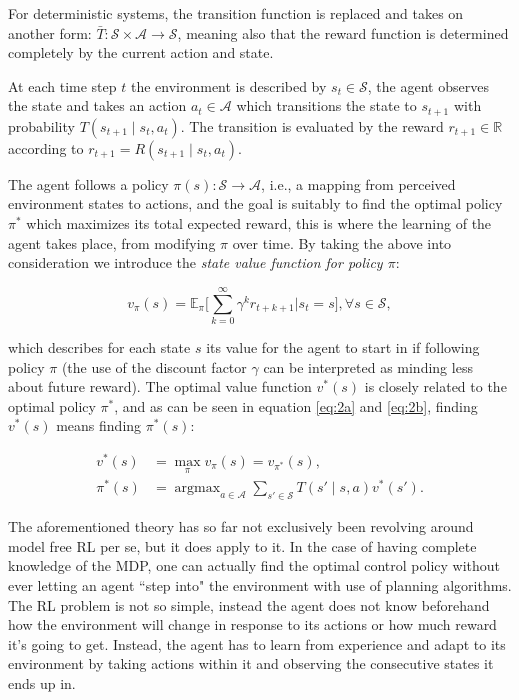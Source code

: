 \documentclass[journal,twoside]{IEEEtran}
\DeclareMathOperator*{\argmax}{argmax}
\begin{document}
For deterministic systems, the transition function is replaced and takes on another form: $\bar{T}:\mathcal{S}\times\mathcal{A}\rightarrow\mathcal{S}$, meaning also that the reward function is determined completely by the current action and state. 

At each time step $t$ the environment is described by $s_t\in\mathcal{S}$, the agent observes the state and takes an action $a_t\in\mathcal{A}$ which transitions the state to $s_{t+1}$ with probability $T(s_{t+1}\mid s_t, a_t)$. The transition is evaluated by the reward $r_{t+1}\in\mathbb{R}$ according to $r_{t+1}=R(s_{t+1}\mid s_t,a_t)$.

The agent follows a policy $\pi(s):\mathcal{S}\rightarrow\mathcal{A}$, i.e., a mapping from perceived environment states to actions, and the goal is suitably to find the optimal policy $\pi^*$ which maximizes its total expected reward, this is where the learning of the agent takes place, from modifying $\pi$ over time. By taking the above into consideration we introduce the \textit{state value function for policy $\pi$}\cite{Sutton:1998:IRL:551283}: 

\begin{equation}
v_\pi(s)=\mathbb{E}_\pi \Bigg[\sum_{k=0}^{\infty}\gamma^{k}r_{t+k+1}\Bigg\vert s_t = s\Bigg], \forall s\in\mathcal{S},
\end{equation}

\noindent which describes for each state $s$ its value for the agent to start in if following policy $\pi$ (the use of the discount factor $\gamma$ can be interpreted as minding less about future reward). The optimal value function $v^*(s)$ is closely related to the optimal policy $\pi^*$, and as can be seen in equation \eqref{eq:2a} and \eqref{eq:2b}, finding $v^*(s)$ means finding $\pi^*(s)$:

\begin{subequations}
\begin{align}
v^*(s)&=\max_{\pi}v_\pi(s)=v_{\pi^*}(s), \label{eq:2a}\\
\pi^*(s)& = \argmax_{a\in\mathcal{A}}\sum_{s'\in\mathcal{S}}T(s'\mid s,a)v^*(s'). \label{eq:2b}
\end{align}
\end{subequations}

The aforementioned theory has so far not exclusively been revolving around model free RL per se, but it does apply to it. In the case of having complete knowledge of the MDP, one can actually find the optimal control policy without ever letting an agent ``step into" the environment with use of planning algorithms. The RL problem is not so simple, instead the agent does not know beforehand how the environment will change in response to its actions or how much reward it's going to get. Instead, the agent has to learn from experience and adapt to its environment by taking actions within it and observing the consecutive states it ends up in. 
\end{document}
